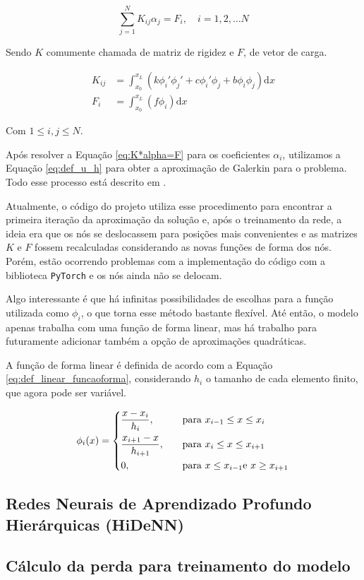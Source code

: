 \begin{equation}
    \sum_{j=1}^{N} K_{ij} \alpha_j = F_i, \quad i=1,2, \dots N
    \label{eq:K*alpha=F}
\end{equation}

Sendo $K$ comumente chamada de matriz de rigidez e $F$, de vetor de carga.  

\begin{align}
    K_{ij} &= \int_{x_0}^{x_L} ( k \phi_i' \phi_j' + c \phi_i' \phi_j + b \phi_i \phi_j ) \mathrm{d} x \\
    F_i &= \int_{x_0}^{x_L} ( f \phi_i ) \mathrm{d} x
\end{align}

Com $1 \leq i,j \leq N$. 

Após resolver a Equação \ref*{eq:K*alpha=F} para os coeficientes $\alpha_i$, utilizamos a Equação \ref*{eq:def_u_h} para obter a aproximação de Galerkin para o problema. Todo esse processo está descrito em .

Atualmente, o código do projeto utiliza esse procedimento para encontrar a primeira iteração da aproximação da solução e, após o treinamento da rede, a ideia era que os nós se deslocassem para posições mais convenientes e as matrizes $K$ e $F$ fossem recalculadas considerando as novas funções de forma dos nós.
Porém, estão ocorrendo problemas com a implementação do código com a biblioteca \texttt{PyTorch} e os nós ainda não se delocam.

Algo interessante é que há infinitas possibilidades de escolhas para a função utilizada como $\phi_i$, o que torna esse método bastante flexível. 
Até então, o modelo apenas trabalha com uma função de forma linear, mas há trabalho para futuramente adicionar também a opção de aproximações quadráticas.

A função de forma linear é definida de acordo com a Equação \ref{eq:def_linear_funcaoforma}, considerando $h_i$ o tamanho de cada elemento finito, que agora pode ser variável.

\begin{equation}
    \phi_i(x)= 
    \begin{dcases}
        \frac{x-x_i}{h_i}, \quad & \text{para } x_{i-1} \leq x \leq x_i \\
        \frac{x_{i+1}-x}{h_{i+1}}, \quad & \text{para } x_{i} \leq x \leq x_{i+1} \\
        0, \quad & \text{para } x \leq x_{i-1} \text{e } x \geq x_{i+1}
    \end{dcases}
\label{eq:def_linear_funcaoforma}
\end{equation}

\subsection{Redes Neurais de Aprendizado Profundo Hierárquicas (HiDeNN)} 

\subsection{Cálculo da perda para treinamento do modelo} \label{sec:calculo_da_perda}